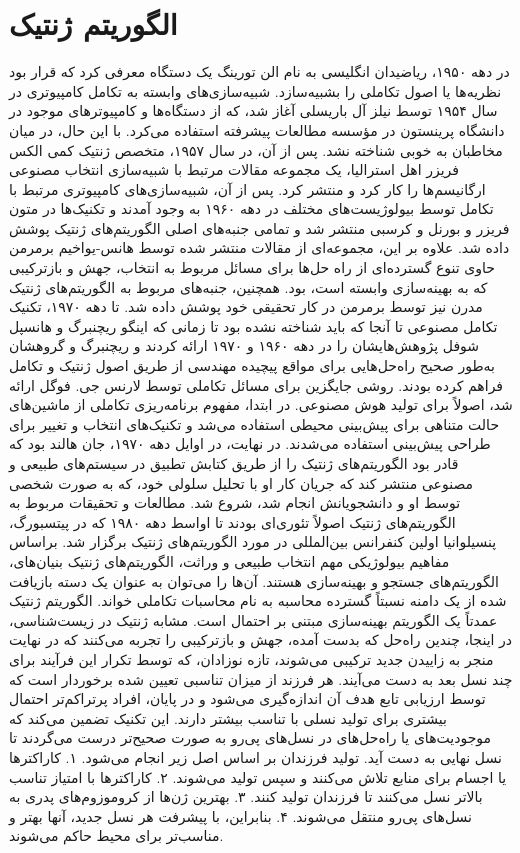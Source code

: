 \documentclass{CSICC2020}
\begin{document}
\section{الگوریتم ژنتیک}
در دهه ۱۹۵۰، ریاضیدان انگلیسی به نام الن تورینگ یک دستگاه معرفی کرد که قرار بود نظریه‌ها یا اصول تکاملی را بشبیه‌سازد. شبیه‌سازی‌های وابسته به تکامل کامپیوتری در سال ۱۹۵۴ توسط نیلز آل باریسلی آغاز شد، که از دستگاه‌ها و کامپیوترهای موجود در دانشگاه پرینستون در مؤسسه مطالعات پیشرفته استفاده می‌کرد. با این حال، در میان مخاطبان به خوبی شناخته نشد. پس از آن، در سال ۱۹۵۷، متخصص ژنتیک کمی الکس فریزر اهل استرالیا، یک مجموعه مقالات مرتبط با شبیه‌سازی انتخاب مصنوعی ارگانیسم‌ها را کار کرد و منتشر کرد. پس از آن، شبیه‌سازی‌های کامپیوتری مرتبط با تکامل توسط بیولوژیست‌های مختلف در دهه ۱۹۶۰ به وجود آمدند و تکنیک‌ها در متون فریزر و بورنل  و کرسبی  منتشر شد و تمامی جنبه‌های اصلی الگوریتم‌های ژنتیک پوشش داده شد. علاوه بر این، مجموعه‌ای از مقالات منتشر شده توسط هانس-یواخیم برمرمن حاوی تنوع گسترده‌ای از راه حل‌ها برای مسائل مربوط به انتخاب، جهش و بازترکیبی که به بهینه‌سازی وابسته است، بود. همچنین، جنبه‌های مربوط به الگوریتم‌های ژنتیک مدرن نیز توسط برمرمن در کار تحقیقی خود پوشش داده شد. تا دهه ۱۹۷۰، تکنیک تکامل مصنوعی تا آنجا که باید شناخته نشده بود تا زمانی که اینگو ریچنبرگ و هانسپل شوفل پژوهش‌هایشان را در دهه ۱۹۶۰ و ۱۹۷۰ ارائه کردند و ریچنبرگ و گروهشان به‌طور صحیح راه‌حل‌هایی برای مواقع پیچیده مهندسی از طریق اصول ژنتیک و تکامل فراهم کرده بودند. روشی جایگزین برای مسائل تکاملی توسط لارنس جی. فوگل ارائه شد، اصولاً برای تولید هوش مصنوعی. در ابتدا، مفهوم برنامه‌ریزی تکاملی از ماشین‌های حالت متناهی برای پیش‌بینی محیطی استفاده می‌شد و تکنیک‌های انتخاب و تغییر برای طراحی پیش‌بینی استفاده می‌شدند. در نهایت، در اوایل دهه ۱۹۷۰، جان هالند بود که قادر بود الگوریتم‌های ژنتیک را از طریق کتابش تطبیق در سیستم‌های طبیعی و مصنوعی منتشر کند که جریان کار او با تحلیل سلولی خود، که به صورت شخصی توسط او و دانشجویانش انجام شد، شروع شد. مطالعات و تحقیقات مربوط به الگوریتم‌های ژنتیک اصولاً تئوری‌ای بودند تا اواسط دهه ۱۹۸۰ که در پیتسبورگ، پنسیلوانیا اولین کنفرانس بین‌المللی در مورد الگوریتم‌های ژنتیک برگزار شد. براساس مفاهیم بیولوژیکی مهم انتخاب طبیعی و وراثت، الگوریتم‌های ژنتیک بنیان‌های، الگوریتم‌های جستجو و بهینه‌سازی هستند. آن‌ها را می‌توان به عنوان یک دسته بازیافت شده از یک دامنه نسبتاً گسترده محاسبه به نام محاسبات تکاملی خواند. الگوریتم ژنتیک عمدتاً یک الگوریتم بهینه‌سازی مبتنی بر احتمال است. مشابه ژنتیک در زیست‌شناسی، در اینجا، چندین راه‌حل که بدست آمده، جهش و بازترکیبی را تجربه می‌کنند که در نهایت منجر به زاییدن جدید ترکیبی می‌شوند، تازه نوزادان، که توسط تکرار این فرآیند برای چند نسل بعد به دست می‌آیند. هر فرزند از میزان تناسبی تعیین شده برخوردار است که توسط ارزیابی تابع هدف آن اندازه‌گیری می‌شود و در پایان، افراد پرتراکم‌تر احتمال بیشتری برای تولید نسلی با تناسب بیشتر دارند. این تکنیک تضمین می‌کند که موجودیت‌های یا راه‌حل‌های در نسل‌های پی‌رو به صورت صحیح‌تر درست می‌گردند تا نسل نهایی به دست آید. تولید فرزندان بر اساس اصل زیر انجام می‌شود.
 ۱. کاراکترها یا اجسام برای منابع تلاش می‌کنند و سپس تولید می‌شوند.
 ۲. کاراکترها با امتیاز تناسب بالاتر نسل می‌کنند تا فرزندان تولید کنند.
 ۳. بهترین ژن‌ها از کروموزوم‌های پدری به نسل‌های پی‌رو منتقل می‌شوند.
۴. بنابراین، با پیشرفت هر نسل جدید، آنها بهتر و مناسب‌تر برای محیط حاکم می‌شوند. 
\end{document}
